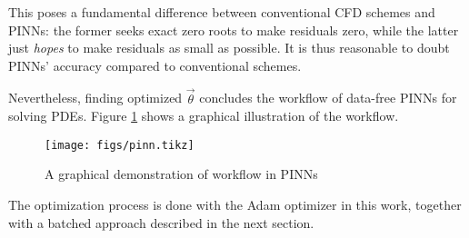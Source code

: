 This poses a fundamental difference between conventional CFD schemes and PINNs: the former seeks exact zero roots to make residuals zero, while the latter just {\it hopes} to make residuals as small as possible.
It is thus reasonable to doubt PINNs' accuracy compared to conventional schemes.

Nevertheless, finding optimized $\vec{\theta}$ concludes the workflow of data-free PINNs for solving PDEs.
Figure \ref{fig:pinn-workflow} shows a graphical illustration of the workflow.
\begin{figure}[hbt!]
    \texttt{[image: figs/pinn.tikz]} 
    \caption{A graphical demonstration of workflow in PINNs}
    \label{fig:pinn-workflow}
\end{figure}

The optimization process is done with the Adam optimizer \cite{kingma_adam_2017} in this work, together with a batched approach described in the next section.
